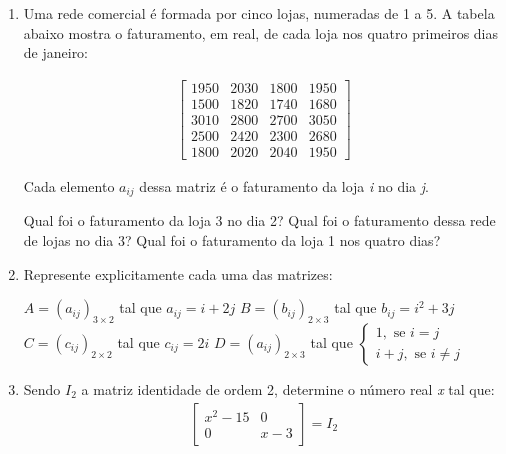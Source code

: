 \begin{enumerate}[label*=\protect\fbox{\arabic{enumi}}]
  \item {
      Uma rede comercial é formada por cinco lojas, numeradas de 1 a 5. A tabela abaixo mostra o faturamento, em real, de 
      cada loja nos quatro primeiros dias de janeiro:

      \begin{equation*}
          \begin{split}
            \begin{bmatrix}
              1950 & 2030 & 1800 & 1950 \\
              1500 & 1820 & 1740 & 1680 \\
              3010 & 2800 & 2700 & 3050 \\
              2500 & 2420 & 2300 & 2680 \\
              1800 & 2020 & 2040 & 1950 
            \end{bmatrix}
          \end{split}
      \end{equation*}

      Cada elemento $a_{ij}$ dessa matriz é o faturamento da loja \textit{i} no dia \textit{j}. 

      \begin{tasks}
        \task Qual foi o faturamento da loja 3 no dia 2?
        \task Qual foi o faturamento dessa rede de lojas no dia 3?
        \task Qual foi o faturamento da loja 1 nos quatro dias?
      \end{tasks}
    }
  \item {
      Represente explicitamente cada uma das matrizes:
      \begin{tasks}
        \task $A = (a_{ij})_{3 \times 2}$ tal que $a_{ij} = i + 2j$
        \task $B = (b_{ij})_{2 \times 3}$ tal que $b_{ij} = i^2 + 3j$
        \task $C = (c_{ij})_{2 \times 2}$ tal que $c_{ij} = 2i$
        \task $D = (a_{ij})_{2 \times 3}$ tal que $\begin{cases} 1, \text{ se } i = j \\ i + j, \text{ se } i \neq j \end{cases}$
      \end{tasks}
    }

  \item {
      Sendo $I_2$ a matriz identidade de ordem 2, determine o número real \textit{x} tal que:
      \begin{equation*}
          \begin{split}
            \begin{bmatrix}
              x^2 - 15 & 0 \\
              0 & x - 3 
            \end{bmatrix} = I_2
          \end{split}
      \end{equation*}
    }


\end{enumerate}
